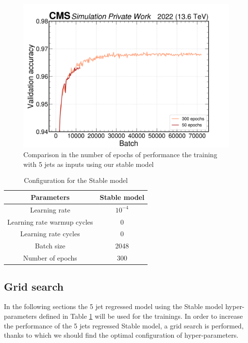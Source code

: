\begin{figure}[hbt]
    \centering
    \includegraphics[width=0.7\linewidth]{Images/6.Improving/Variability Study/epoch comp.png}
    \caption{Comparison in the number of epochs of performance the training with 5 jets as inputs using our stable model}
    \label{fig: epoch diff}
\end{figure}

\begin{table}[hbt]
\centering
\begin{tabular}{|c|c|}
 \hline
 Parameters  & Stable model  \\
 \hline
 Learning rate &  $10^{-4}$ \\
 \hline
 Learning rate warmup cycles &  0\\
 \hline
  Learning rate cycles & 0\\
 \hline
 Batch size & 2048 \\
 \hline
 Number of epochs & 300 \\
 \hline
\end{tabular}
\caption{Configuration for the Stable model}
\label{table: stable model}
\end{table}


\newpage

\subsection{Grid search} \label{subsection: grid search}

In the following sections the 5 jet \pt regressed model using the Stable model hyper-parameters defined in Table \ref{table: stable model} will be used for the trainings. In order to increase the performance of the 5 jets \pt regressed Stable model, a grid search is performed, thanks to which we should find the optimal configuration of hyper-parameters.


